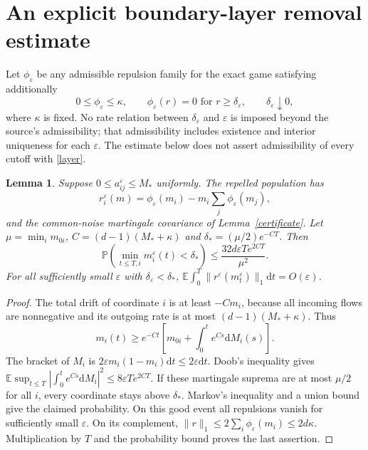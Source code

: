 \documentclass[11pt]{article}
\newtheorem{lemma}[theorem]{Lemma}
\newcommand{\E}{\mathbb E}
\newcommand{\Pp}{\mathbb P}
\newcommand{\dd}{\mathrm d}
\begin{document}
\section{An explicit boundary-layer removal estimate}
Let $\phi_\varepsilon$ be any admissible repulsion family for the exact game satisfying additionally
\begin{equation}\label{layer}
 0\le\phi_\varepsilon\le\kappa,\qquad
 \phi_\varepsilon(r)=0\text{ for }r\ge\delta_\varepsilon,\qquad
 \delta_\varepsilon\downarrow0,
\end{equation}
where $\kappa$ is fixed. No rate relation between $\delta_\varepsilon$ and $\varepsilon$ is imposed beyond the source's admissibility; that admissibility includes existence and interior uniqueness for each $\varepsilon$. The estimate below does not assert admissibility of every cutoff with \eqref{layer}.

\begin{lemma}\label{boundary}
Suppose $0\le a_{ij}^\varepsilon\le M_*$ uniformly. The repelled population has
\[
 r_i^\varepsilon(m)=\phi_\varepsilon(m_i)-m_i\sum_j\phi_\varepsilon(m_j),
\]
and the common-noise martingale covariance of Lemma~\ref{certificate}. Let $\mu=\min_i m_{0i}$, $C=(d-1)(M_*+\kappa)$ and $\delta_*=(\mu/2)e^{-CT}$. Then
\[
 \Pp\left(\min_{t\le T,i}m_i^\varepsilon(t)<\delta_*\right)
 \le\frac{32d\varepsilon T e^{2CT}}{\mu^2}.
\]
For all sufficiently small $\varepsilon$ with $\delta_\varepsilon<\delta_*$,
$\E\int_0^T\|r^\varepsilon(m_t^\varepsilon)\|_1\dd t=O(\varepsilon)$.
\end{lemma}
\begin{proof}
The total drift of coordinate $i$ is at least $-Cm_i$, because all incoming flows are nonnegative and its outgoing rate is at most $(d-1)(M_*+\kappa)$. Thus
\[
 m_i(t)\ge e^{-Ct}\left[m_{0i}+\int_0^te^{Cs}\dd M_i(s)\right].
\]
The bracket of $M_i$ is $2\varepsilon m_i(1-m_i)\dd t\le2\varepsilon\dd t$. Doob's inequality gives
$\E\sup_{t\le T}|\int_0^te^{Cs}\dd M_i|^2\le8\varepsilon T e^{2CT}$.
If these martingale suprema are at most $\mu/2$ for all $i$, every coordinate stays above $\delta_*$. Markov's inequality and a union bound give the claimed probability. On this good event all repulsions vanish for sufficiently small $\varepsilon$. On its complement, $\|r\|_1\le2\sum_i\phi_\varepsilon(m_i)\le2d\kappa$. Multiplication by $T$ and the probability bound proves the last assertion.
\end{proof}
\end{document}
